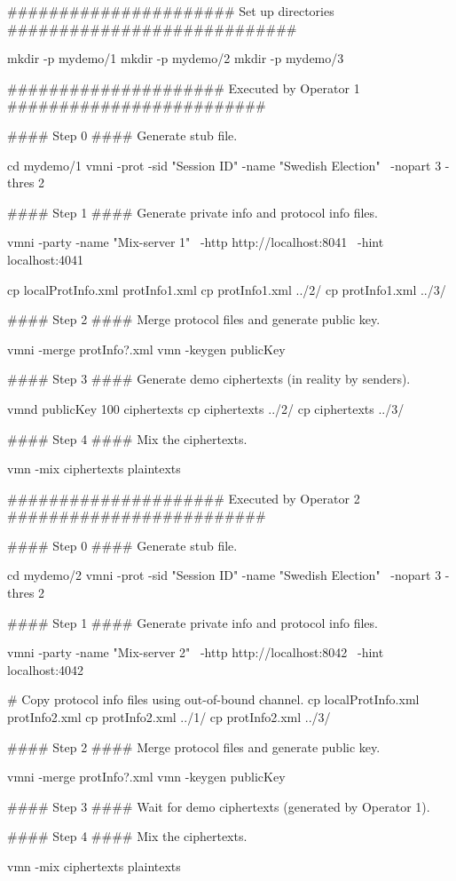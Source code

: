 
###################### Set up directories ############################

mkdir -p mydemo/1
mkdir -p mydemo/2
mkdir -p mydemo/3

##################### Executed by Operator 1 #########################

#### Step 0 #### Generate stub file.

cd mydemo/1
vmni -prot -sid "Session ID" -name "Swedish Election" \
     -nopart 3 -thres 2

#### Step 1 #### Generate private info and protocol info files.

vmni -party -name "Mix-server 1" \
-http http://localhost:8041 \
-hint localhost:4041

cp localProtInfo.xml protInfo1.xml
cp protInfo1.xml ../2/
cp protInfo1.xml ../3/

#### Step 2 #### Merge protocol files and generate public key.

vmni -merge protInfo?.xml
vmn -keygen publicKey

#### Step 3 #### Generate demo ciphertexts (in reality by senders).

vmnd publicKey 100 ciphertexts
cp ciphertexts ../2/
cp ciphertexts ../3/

#### Step 4 #### Mix the ciphertexts.

vmn -mix ciphertexts plaintexts


##################### Executed by Operator 2 #########################

#### Step 0 #### Generate stub file.

cd mydemo/2
vmni -prot -sid "Session ID" -name "Swedish Election" \
     -nopart 3 -thres 2

#### Step 1 #### Generate private info and protocol info files.

vmni -party -name "Mix-server 2" \
-http http://localhost:8042 \
-hint localhost:4042

# Copy protocol info files using out-of-bound channel.
cp localProtInfo.xml protInfo2.xml
cp protInfo2.xml ../1/
cp protInfo2.xml ../3/

#### Step 2 #### Merge protocol files and generate public key.

vmni -merge protInfo?.xml
vmn -keygen publicKey

#### Step 3 #### Wait for demo ciphertexts (generated by Operator 1).

#### Step 4 #### Mix the ciphertexts.

vmn -mix ciphertexts plaintexts


